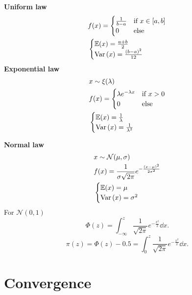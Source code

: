 \documentclass{report}
\begin{document}
\begin{enumerate}
	\ii \textbf{Uniform law}
	\begin{align*}
		 & f(x) = \begin{cases}
			          \frac{1}{b-a} & \text{if } x\in[a,b] \\
			          0             & \text{else}
		          \end{cases} \\
		 & \begin{cases}
			   \mathbb{E}(x) =  \frac{a+b}{2} \\
			   \mathrm{Var}\left( x \right) = \frac{(b-a)^2}{12}
		   \end{cases}
	\end{align*}
	\ii \textbf{Exponential law}
	\begin{align*}
		 & x \sim \xi(\lambda)                            \\
		 & f(x) = \begin{cases}
			          \lambda e^{-\lambda x} & \text{if } x>0 \\
			          0                      & \text{else}
		          \end{cases} \\
		 & \begin{cases}
			   \mathbb{E}(x) =  \frac{1}{\lambda} \\
			   \mathrm{Var}\left( x \right) = \frac{1}{\lambda^2}
		   \end{cases}
	\end{align*}

	\ii \textbf{Normal law}
	\begin{align*}
		 & x \sim \mathcal{N}(\mu,\sigma)                                     \\
		 & f(x) = \frac{1}{\sigma\sqrt{2\pi}}e^{-\frac{(x-\mu)^2}{2\sigma^2}} \\
		 & \begin{cases}
			   \mathbb{E}(x) =  \mu \\
			   \mathrm{Var}\left( x \right) = \sigma^2
		   \end{cases}
	\end{align*}
	For $\mathcal{N}(0,1)$
	\[
		\Phi(z) = \int_{-\infty}^z\frac{1}{\sqrt{2\pi}}e^{-\frac{x^2}{2}}\dd{x}
		.\]
	\[
		\pi(z) = \Phi(z) - 0.5 = \int_0^z\frac{1}{\sqrt{2\pi}}e^{-\frac{x^2}{2}}\dd{x}
		.\]

\end{enumerate}

\section{Convergence}
\end{document}
